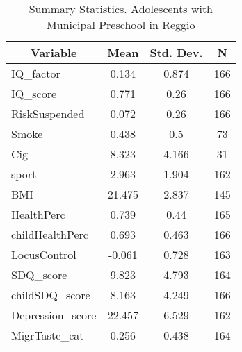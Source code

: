 
\begin{table}[htbp]\centering \caption{Summary Statistics. Adolescents with Municipal Preschool in Reggio \label{bothAdolmaternaMuniReggio}}
\begin{tabular}{l c c  c}\hline\hline
\multicolumn{1}{c}{\textbf{Variable}} & \textbf{Mean}
 & \textbf{Std. Dev.} & \textbf{N}\\ \hline
IQ\_factor & 0.134 & 0.874  & 166\\
IQ\_score & 0.771 & 0.26  & 166\\
RiskSuspended & 0.072 & 0.26  & 166\\
Smoke & 0.438 & 0.5  & 73\\
Cig & 8.323 & 4.166  & 31\\
sport & 2.963 & 1.904  & 162\\
BMI & 21.475 & 2.837  & 145\\
HealthPerc & 0.739 & 0.44  & 165\\
childHealthPerc & 0.693 & 0.463  & 166\\
LocusControl & -0.061 & 0.728  & 163\\
SDQ\_score & 9.823 & 4.793  & 164\\
childSDQ\_score & 8.163 & 4.249  & 166\\
Depression\_score & 22.457 & 6.529  & 162\\
MigrTaste\_cat & 0.256 & 0.438  & 164\\
\hline\end{tabular}
\end{table}
